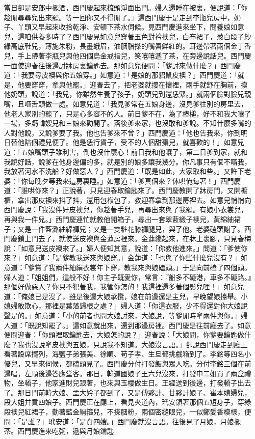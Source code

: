 當日卻是安郎中擺酒，西門慶起來梳頭淨面出門。婦人還睡在被裏，便說道：「你趁閒尋尋兒出來罷。等一回你又不得閒了。」這西門慶于是走到李瓶兒房中，奶子、丫頭又早起來收拾乾淨、安頓下茶水伺候。見西門慶進來坐下，問養娘如意兒，這咱供養多時了？西門慶見如意兒穿著玉色對衿襖兒，白布裙子，葱白段子紗綠高底鞋兒，薄施朱粉，長畫蛾眉，油胭脂搽的嘴唇鮮紅的。耳邊帶著兩個金丁香兒，手上帶著李瓶兒與他四個烏金戒指兒，笑嘻嘻遞了茶，在旁邊說話兒。西門慶一面使迎春往後邊討牀房裏鑰匙去。那如意兒便問：「爹討來做什麼？」西門慶道：「我要尋皮襖與你五娘穿。」如意道：「是娘的那貂鼠皮襖？」西門慶道：「就是，他要穿穿，拿與他罷。」迎春去了，把老婆就摟在懷裡，兩手就舒在胸前，摸他奶頭，說道：「我兒，你雖然生養了孩子，奶頭兒到還恁緊。」就兩個臉對臉兒親嘴，且咂舌頭做一處。如意兒道：「我見爹常在五娘身邊，沒見爹往別的房里去，他老人家別的罷了，只是心多容不的人。前日爹不在，為了棒槌，好不和我大嚷了一場，多虧韓嫂兒和三娘來勸開了。落後爹來家，也沒敢和爹說。不知什麼多嘴的人對他說，又說爹要了我。他也告爹來不曾？」西門慶道：「他也告我來，你到明日替他陪個禮兒便了。他是恁行貨子，受不的人個甜棗兒，就喜歡的！」如意兒道：「五娘嘴頭子雖利害，倒也沒什麼心！前日我和他嚷了，第二日爹到家，就和我說好話，說爹在他身邊偏的多，就是別的娘多讓我幾分。你凡事只有個不瞞我，我放著河水不洗船？好做惡人？」西門慶道：「既是如此，大家取和些。」又許下老婆：「你每晚夕等我來這房裏睡。」如意道：「爹真個來？休哄俺每著！」西門慶道：「誰哄你來？」正說著，只見迎春取鑰匙來了。西門慶教開了牀房門，又開櫥櫃，拿出那皮襖來抖了抖，還用包袱包了，教迎春拿到那邊房裡去。如意兒悄悄向西門慶說：「我沒件好皮襖兒，你趁著手兒，再尋出來與了我罷。有娘小衣裳兒，再與我一件兒。」西門慶連忙就教他開箱子，尋出一套翠藍緞子襖兒，黃綿紬裙子；又是一件藍潞紬綿褲兒；又是一雙粧花膝褲腿兒，與了他。老婆磕頭謝了。西門慶鎖上門去了，就使送皮襖與金蓮房裡來。金蓮纔起來，在牀上裹腳，只見春梅說：「如意兒送皮襖來了。」婦人便知其意，說道：「你教他進來。」問道：「爹使你來？」如意道：「是爹教我送來與娘穿。」金蓮道：「也與了你些什麼兒沒有？」如意道：「爹賞了我兩件紬絹衣裳年下穿，教我來與娘磕頭。」于是向前磕了四個頭。婦人道：「姐姐們，這般不好！你主子既愛你，常言：『船多不礙港，車多不礙路。』那個好做惡人？你只不犯著我，我管你怎的！我這裡還多著個影兒哩！」如意兒道：「俺娘已是沒了，雖是後邊大娘承攬，娘在前邊還是主兒，早晚望娘擡舉。小媳婦敢欺心，那裡是葉落歸根之處？」婦人道：「你這衣服，少不得還對你大娘說聲是的。」如意道：「小的前者也問大娘討來，大娘說，等爹閒時拿兩件與你。」婦人道：「既說知罷了。」這如意就出來，還到那邊房裡。西門慶是往前廳去了。如意便問迎春：「你頭裡取鑰匙去，大娘怎的說？」迎春說：「大娘問，你爹要鑰匙做什麼？我也沒說拿皮襖與五娘，只說我不知道。大娘沒言語。」卻說西門慶走到廳上看著設席擺列，海鹽子弟張美、徐順、苟子孝、生旦都挑戲箱到了。李銘等四名小優兒，又早來伺候，都磕頭見了。西門慶分付打發飯與眾人吃。分付李銘三個在前邊唱，左順後邊答應堂客。那日，韓道國娘子王六兒沒來，打發申二姐買了兩盒禮物，坐轎子，他家進財兒跟著，也來與玉樓做生日。王經送到後邊，打發轎子出去了。那日門前韓大娘、孟大妗子都到了，又是傅夥計、甘夥計娘子、崔本媳婦兒，段大姐并賁四娘子。西門慶正在廳上，看見夾道內，玳安領著那個五短身子，穿綠段襖兒紅裙子，勤著藍金綃箍兒，不搽胭粉，兩個密縫眼兒，一似鄭愛香模樣，便問：「是誰？」玳安道：「是賁四嫂。」西門慶就沒言語。往後見了月娘，月娘擺茶。西門慶進來吃粥，遞與月娘鑰匙